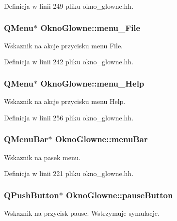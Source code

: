 Definicja w linii 249 pliku okno\-\_\-glowne.\-hh.

\hypertarget{class_okno_glowne_a1ba162db2d0b06b0f8963e61b3806875}{
\subsubsection[{menu\-\_\-\-File}]{\setlength{\rightskip}{0pt plus 5cm}Q\-Menu$\ast$ Okno\-Glowne\-::menu\-\_\-\-File\hspace{0.3cm}{\ttfamily [private]}}}\label{class_okno_glowne_a1ba162db2d0b06b0f8963e61b3806875}
Wskaznik na akcje przycisku menu File. 

Definicja w linii 242 pliku okno\-\_\-glowne.\-hh.

\hypertarget{class_okno_glowne_ab17be6714913af0cdf4e7de7cb6210d1}{
\subsubsection[{menu\-\_\-\-Help}]{\setlength{\rightskip}{0pt plus 5cm}Q\-Menu$\ast$ Okno\-Glowne\-::menu\-\_\-\-Help\hspace{0.3cm}{\ttfamily [private]}}}\label{class_okno_glowne_ab17be6714913af0cdf4e7de7cb6210d1}
Wskaznik na akcje przycisku menu Help. 

Definicja w linii 256 pliku okno\-\_\-glowne.\-hh.

\hypertarget{class_okno_glowne_a5a87098d9d4bd868670f5a5e72023a0a}{
\subsubsection[{menu\-Bar}]{\setlength{\rightskip}{0pt plus 5cm}Q\-Menu\-Bar$\ast$ Okno\-Glowne\-::menu\-Bar\hspace{0.3cm}{\ttfamily [private]}}}\label{class_okno_glowne_a5a87098d9d4bd868670f5a5e72023a0a}
Wskaznik na pasek menu. 

Definicja w linii 221 pliku okno\-\_\-glowne.\-hh.

\hypertarget{class_okno_glowne_a0dde8df8a49b8f47f17f8e748fd15967}{
\subsubsection[{pause\-Button}]{\setlength{\rightskip}{0pt plus 5cm}Q\-Push\-Button$\ast$ Okno\-Glowne\-::pause\-Button\hspace{0.3cm}{\ttfamily [private]}}}\label{class_okno_glowne_a0dde8df8a49b8f47f17f8e748fd15967}
Wskaznik na przycisk pause. Wstrzymuje symulacje. 

